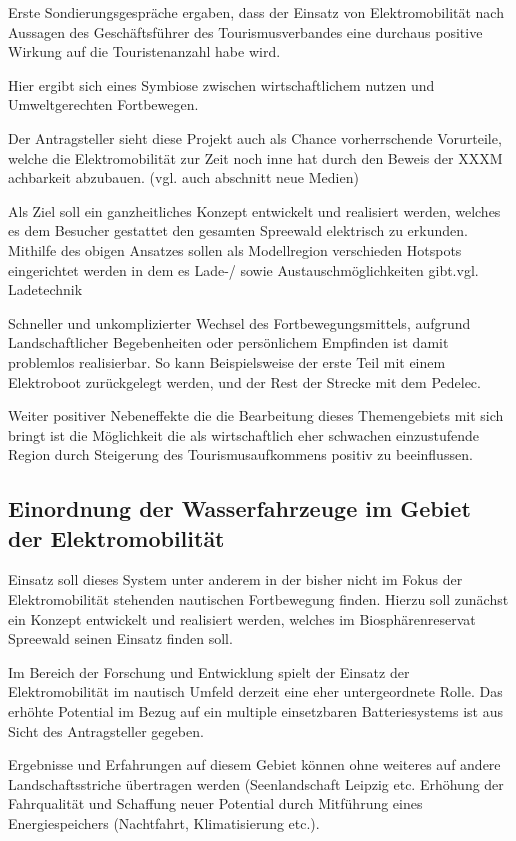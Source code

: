Erste Sondierungsgespräche ergaben, dass der Einsatz von Elektromobilität nach Aussagen des Geschäftsführer des Tourismusverbandes eine durchaus positive Wirkung auf die Touristenanzahl habe wird. 

Hier ergibt sich eines Symbiose zwischen wirtschaftlichem nutzen und Umweltgerechten Fortbewegen.


Der Antragsteller sieht diese Projekt auch als Chance  vorherrschende Vorurteile, welche die Elektromobilität zur Zeit noch inne hat durch den Beweis der XXXM achbarkeit abzubauen.
(vgl. auch abschnitt neue Medien)

Als Ziel soll ein ganzheitliches Konzept entwickelt und realisiert werden, welches es dem Besucher gestattet den gesamten Spreewald elektrisch zu erkunden. Mithilfe des obigen Ansatzes sollen als Modellregion verschieden Hotspots eingerichtet werden in dem es Lade-/ sowie Austauschmöglichkeiten gibt.{vgl. Ladetechnik}

Schneller und unkomplizierter Wechsel des Fortbewegungsmittels, aufgrund Landschaftlicher Begebenheiten oder persönlichem Empfinden ist damit problemlos realisierbar. So kann Beispielsweise  der erste Teil mit einem Elektroboot zurückgelegt werden, und der Rest der Strecke mit dem Pedelec.

Weiter positiver Nebeneffekte die die Bearbeitung dieses Themengebiets mit sich bringt ist die Möglichkeit die als wirtschaftlich eher schwachen einzustufende Region durch Steigerung des Tourismusaufkommens positiv zu beeinflussen.

\subsection{ Einordnung der Wasserfahrzeuge im Gebiet der Elektromobilität}
\label{sec:EinordnungDerWasserfahrzeugeImGebietDerElektromobilität}

Einsatz soll dieses System unter anderem in der bisher nicht im Fokus der Elektromobilität stehenden nautischen Fortbewegung finden.
Hierzu soll zunächst ein Konzept entwickelt und  realisiert werden, welches im Biosphärenreservat Spreewald seinen Einsatz finden soll.

Im Bereich der Forschung und Entwicklung spielt der Einsatz der Elektromobilität im nautisch Umfeld derzeit eine eher untergeordnete Rolle. Das erhöhte Potential im Bezug auf ein multiple einsetzbaren Batteriesystems ist aus Sicht des Antragsteller gegeben. 

Ergebnisse und Erfahrungen auf diesem Gebiet können ohne weiteres auf andere Landschaftsstriche übertragen werden (Seenlandschaft Leipzig etc. Erhöhung der Fahrqualität und Schaffung neuer Potential durch Mitführung eines Energiespeichers (Nachtfahrt, Klimatisierung etc.).

